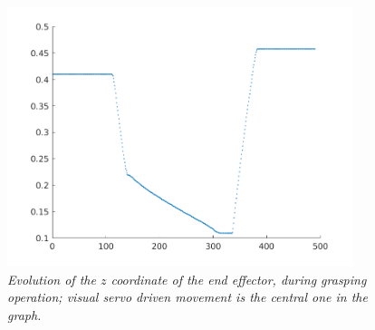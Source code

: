 \begin{figure}
	\centering
	\includegraphics[width=0.9\textwidth]{Images/experimental_data/grasping_z.png}
	\caption{\textit{Evolution of the $z$ coordinate of the end effector, during grasping operation; visual servo driven movement is the central one in the graph.}}
	\label{fig:graspingZ}
\end{figure}






